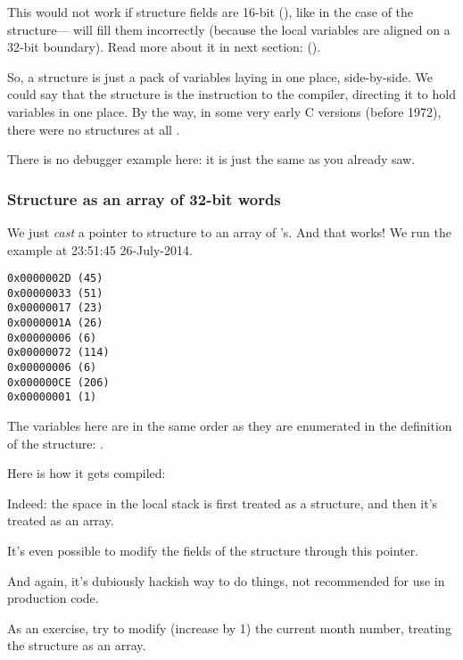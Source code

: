 This would not work if structure fields are 16-bit (), 
like in the case of the  structure--- 
will fill them incorrectly 
(because the local variables are aligned on a 32-bit boundary).
Read more about it in next section: 
\q{\StructurePackingSectionName} ().

So, a structure is just a pack of variables laying in one place, side-by-side.
We could say that the structure is the instruction to the compiler, directing it to hold variables in one place.
By the way, in some very early C versions (before 1972), there were no structures at all \RitchieDevC.

There is no debugger example here: it is just the same as you already saw.

\subsubsection{Structure as an array of 32-bit words}



We just \emph{cast} a pointer to structure to an array of \Tint{}'s.
And that works!
We run the example at 23:51:45 26-July-2014.

\begin{lstlisting}[label=GCC_tm3_output]
0x0000002D (45)
0x00000033 (51)
0x00000017 (23)
0x0000001A (26)
0x00000006 (6)
0x00000072 (114)
0x00000006 (6)
0x000000CE (206)
0x00000001 (1)
\end{lstlisting}

The variables here 
are in the same order as they are enumerated in the definition of the structure: .

Here is how it gets compiled:



Indeed: the space in the local stack is first treated as a structure, and then it's treated as an array.

It's even possible to modify the fields of the structure through this pointer.

And again, it's dubiously hackish way to do things, not recommended for use in production code.

\mysubparagraph{\Exercise}

As an exercise, try to modify (increase by 1) the current month number, treating the structure as 
an array.

